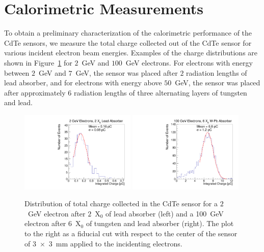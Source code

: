 
\section{Calorimetric Measurements} 
\label{sec:calorimetery} 

To obtain a preliminary characterization of the calorimetric performance 
of the CdTe sensors, we measure the total charge collected out of the CdTe 
sensor for various incident electron beam energies. Examples of the 
charge distributions are shown in Figure~\ref{fig:ChargeDistribution}
for $2$~GeV and $100$~GeV electrons. For electrons with energy between 
$2$~GeV and $7$~GeV, the sensor was placed after $2$ radiation lengths 
of lead absorber, and for electrons with energy above $50$~GeV, the 
sensor was placed after approximately $6$ radiation lengths of three alternating layers of 
tungsten and lead. 

\begin{figure}[htbp] 
\centering
\includegraphics[width=0.49\textwidth]{figures/2GeV_charge.pdf} 
\includegraphics[width=0.49\textwidth]{figures/100GeV_charge.pdf} 
\caption{Distribution of total charge collected in the CdTe sensor for a $2$~GeV
electron after $2$~$\mathrm{X}_{0}$ of lead absorber (left) and a 100~GeV
electron after $6$~$\mathrm{X}_{0}$ of tungsten and lead absorber (right). The plot
to the right as a fiducial cut with respect to the center of the sensor of 3~$\times$~3~mm applied to the incidenting electrons.} 
\label{fig:ChargeDistribution} 
\end{figure} 

